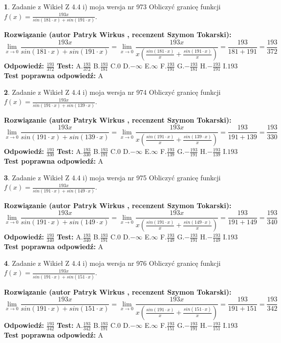 \documentclass[12pt, a4paper]{article}
\theoremstyle{definition} %
\newtheorem{zad}{}
\newcommand{\zadStart}[1]{\begin{zad}#1\newline}
\newcommand{\zadStop}{\end{zad}}
\newcommand{\rozwStart}[2]{\noindent \textbf{Rozwiązanie (autor #1 , recenzent #2): }\newline}
\newcommand{\rozwStop}{\newline}
\newcommand{\odpStart}{\noindent \textbf{Odpowiedź:}\newline}
\newcommand{\odpStop}{\newline}
\newcommand{\testStart}{\noindent \textbf{Test:}\newline}
\newcommand{\testStop}{\newline}
\newcommand{\kluczStart}{\noindent \textbf{Test poprawna odpowiedź:}\newline}
\newcommand{\kluczStop}{\newline}
\begin{document}
\zadStart{Zadanie z Wikieł Z 4.4 i) moja wersja nr 973}
Obliczyć granicę funkcji $f(x)=\frac{193x}{sin(181\cdot x) +sin(191\cdot x)}$.
\zadStop
\rozwStart{Patryk Wirkus}{Szymon Tokarski}
$$\lim\limits_{x\to 0}\frac{193x}{sin(181\cdot x) +sin(191\cdot x)}=\lim\limits_{x\to 0}\frac{193x}{x(\frac{sin(181\cdot x)}{x}+\frac{sin(191\cdot x)}{x})}=\frac{193}{181+191} = \frac{193}{372}$$
\rozwStop
\odpStart
$\frac{193}{372}$
\odpStop
\testStart
A.$\frac{193}{372}$
B.$\frac{193}{181}$
C.$0$
D.$-\infty$
E.$\infty$
F.$\frac{193}{191}$
G.$-\frac{193}{181}$
H.$-\frac{193}{191}$
I.$193$
\testStop
\kluczStart
A
\kluczStop



\zadStart{Zadanie z Wikieł Z 4.4 i) moja wersja nr 974}
Obliczyć granicę funkcji $f(x)=\frac{193x}{sin(191\cdot x) +sin(139\cdot x)}$.
\zadStop
\rozwStart{Patryk Wirkus}{Szymon Tokarski}
$$\lim\limits_{x\to 0}\frac{193x}{sin(191\cdot x) +sin(139\cdot x)}=\lim\limits_{x\to 0}\frac{193x}{x(\frac{sin(191\cdot x)}{x}+\frac{sin(139\cdot x)}{x})}=\frac{193}{191+139} = \frac{193}{330}$$
\rozwStop
\odpStart
$\frac{193}{330}$
\odpStop
\testStart
A.$\frac{193}{330}$
B.$\frac{193}{191}$
C.$0$
D.$-\infty$
E.$\infty$
F.$\frac{193}{139}$
G.$-\frac{193}{191}$
H.$-\frac{193}{139}$
I.$193$
\testStop
\kluczStart
A
\kluczStop



\zadStart{Zadanie z Wikieł Z 4.4 i) moja wersja nr 975}
Obliczyć granicę funkcji $f(x)=\frac{193x}{sin(191\cdot x) +sin(149\cdot x)}$.
\zadStop
\rozwStart{Patryk Wirkus}{Szymon Tokarski}
$$\lim\limits_{x\to 0}\frac{193x}{sin(191\cdot x) +sin(149\cdot x)}=\lim\limits_{x\to 0}\frac{193x}{x(\frac{sin(191\cdot x)}{x}+\frac{sin(149\cdot x)}{x})}=\frac{193}{191+149} = \frac{193}{340}$$
\rozwStop
\odpStart
$\frac{193}{340}$
\odpStop
\testStart
A.$\frac{193}{340}$
B.$\frac{193}{191}$
C.$0$
D.$-\infty$
E.$\infty$
F.$\frac{193}{149}$
G.$-\frac{193}{191}$
H.$-\frac{193}{149}$
I.$193$
\testStop
\kluczStart
A
\kluczStop



\zadStart{Zadanie z Wikieł Z 4.4 i) moja wersja nr 976}
Obliczyć granicę funkcji $f(x)=\frac{193x}{sin(191\cdot x) +sin(151\cdot x)}$.
\zadStop
\rozwStart{Patryk Wirkus}{Szymon Tokarski}
$$\lim\limits_{x\to 0}\frac{193x}{sin(191\cdot x) +sin(151\cdot x)}=\lim\limits_{x\to 0}\frac{193x}{x(\frac{sin(191\cdot x)}{x}+\frac{sin(151\cdot x)}{x})}=\frac{193}{191+151} = \frac{193}{342}$$
\rozwStop
\odpStart
$\frac{193}{342}$
\odpStop
\testStart
A.$\frac{193}{342}$
B.$\frac{193}{191}$
C.$0$
D.$-\infty$
E.$\infty$
F.$\frac{193}{151}$
G.$-\frac{193}{191}$
H.$-\frac{193}{151}$
I.$193$
\testStop
\kluczStart
A
\kluczStop
\end{document}
